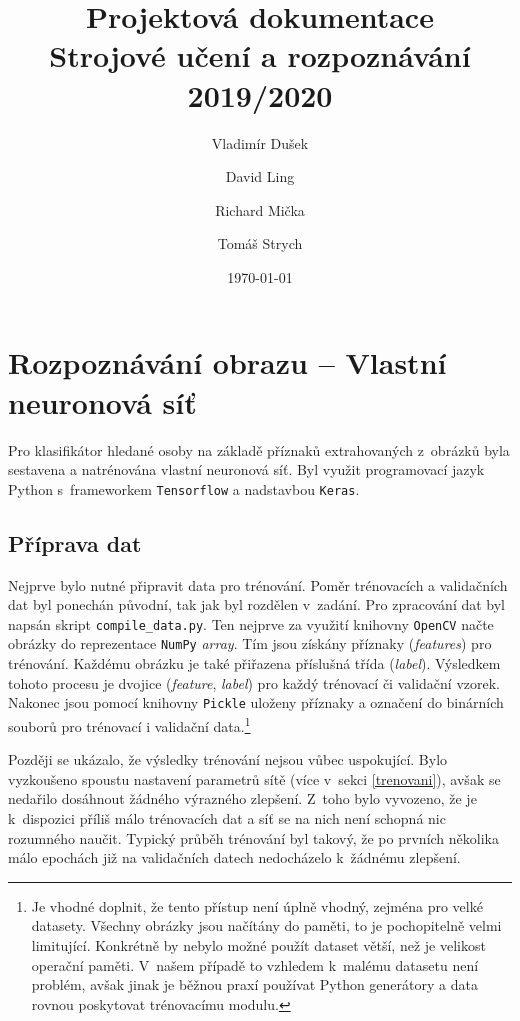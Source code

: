 \documentclass{article}
\title{Projektová dokumentace \\
    \large Strojové učení a rozpoznávání 2019/2020}
\author{Vladimír Dušek\and David Ling \and Richard Mička \and Tomáš Strych}
\date{\today}
\begin{document}
\maketitle


\section{Rozpoznávání obrazu -- Vlastní neuronová síť}

Pro klasifikátor hledané osoby na základě příznaků extrahovaných
z~obrázků byla sestavena a natrénována vlastní neuronová síť.
Byl využit programovací jazyk Python s~frameworkem \texttt{Tensorflow} a nadstavbou \texttt{Keras}.

\subsection{Příprava dat} \label{priprava_dat}

Nejprve bylo nutné připravit data pro trénování.
Poměr trénovacích a validačních dat byl ponechán původní, tak jak byl rozdělen v~zadání.
Pro zpracování dat byl napsán skript \texttt{compile\_data.py}.
Ten nejprve za využití knihovny \texttt{OpenCV} načte obrázky
do reprezentace \texttt{NumPy} \textit{array}.
Tím jsou získány příznaky (\textit{features}) pro trénování.
Každému obrázku je také přiřazena příslušná třída (\textit{label}).
Výsledkem tohoto procesu je dvojice (\textit{feature}, \textit{label})
pro každý trénovací či validační vzorek.
Nakonec jsou pomocí knihovny \texttt{Pickle} uloženy příznaky a označení do binárních souborů
pro trénovací i validační data.\footnote{Je vhodné doplnit,
že tento přístup není úplně vhodný, zejména pro velké datasety.
Všechny obrázky jsou načítány do paměti, to je pochopitelně velmi limitující.
Konkrétně by nebylo možné použít dataset větší, než je velikost operační paměti.
V~našem případě to vzhledem k~malému datasetu není problém, avšak jinak je běžnou praxí
používat Python generátory a data rovnou poskytovat trénovacímu modulu.}

Později se ukázalo, že výsledky trénování nejsou vůbec uspokující.
Bylo vyzkoušeno spoustu nastavení parametrů sítě (více v~sekci \ref{trenovani}),
avšak se nedařilo dosáhnout žádného výrazného zlepšení.
Z~toho bylo vyvozeno, že je k~dispozici příliš málo trénovacích dat
a síť se na nich není schopná nic rozumného naučit.
Typický průběh trénování byl takový, že po prvních několika málo epochách již
na validačních datech nedocházelo k~žádnému zlepšení.
\end{document}
